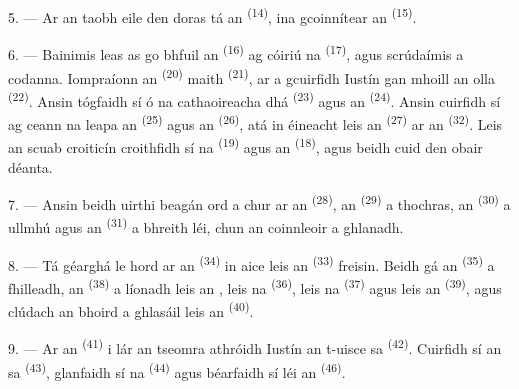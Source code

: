 5. --- Ar an taobh eile den doras tá an 
\textsuperscript{(14)}, ina gcoinnítear an 
\textsuperscript{(15)}.

6. --- Bainimis leas as go bhfuil an 
\textsuperscript{(16)} ag cóiriú na  \textsuperscript{(17)}, agus
scrúdaímis a codanna. Iompraíonn an  \textsuperscript{(20)}
 maith \textsuperscript{(21)}, ar a gcuirfidh Iustín gan
mhoill an  olla \textsuperscript{(22)}. Ansin tógfaidh sí ó na
cathaoireacha dhá  \textsuperscript{(23)} agus an
 \textsuperscript{(24)}. Ansin cuirfidh sí ag ceann na leapa an
 \textsuperscript{(25)} agus an 
\textsuperscript{(26)}, atá in éineacht leis an 
\textsuperscript{(27)} ar an  \textsuperscript{(32)}. Leis an
scuab croiticín croithfidh sí na  \textsuperscript{(19)} agus an
 \textsuperscript{(18)}, agus beidh cuid den obair déanta.

7. --- Ansin beidh uirthi beagán ord a chur ar an 
\textsuperscript{(28)}, an  \textsuperscript{(29)} a thochras,
an  \textsuperscript{(30)} a ullmhú agus an 
\textsuperscript{(31)} a bhreith léi, chun an coinnleoir a ghlanadh.

\VUsaut{5.0mm}
\VUsaut{3.0mm}

8. --- Tá géarghá le hord ar an  \textsuperscript{(34)} in
aice leis an  \textsuperscript{(33)} freisin. Beidh gá an
 \textsuperscript{(35)} a fhilleadh, an  \textsuperscript{(38)} a líonadh leis an , leis na
 \textsuperscript{(36)}, leis na 
\textsuperscript{(37)} agus leis an  \textsuperscript{(39)}, agus
clúdach an bhoird a ghlasáil leis an  \textsuperscript{(40)}.

9. --- Ar an  \textsuperscript{(41)} i lár an tseomra
athróidh Iustín an t-uisce sa  \textsuperscript{(42)}. Cuirfidh sí
an  sa  \textsuperscript{(43)}, glanfaidh sí na
 \textsuperscript{(44)} agus béarfaidh sí léi an  \textsuperscript{(46)}.

